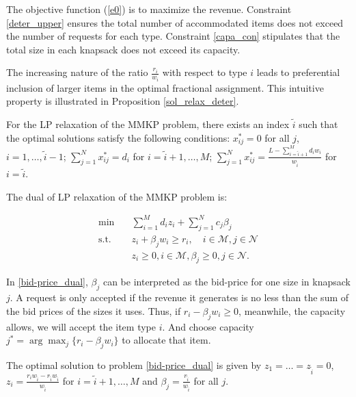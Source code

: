 The objective function (\ref{e0}) is to maximize the revenue. Constraint \eqref{deter_upper} ensures the total number of accommodated items does not exceed the number of requests for each type. Constraint \eqref{capa_con} stipulates that the total size in each knapsack does not exceed its capacity.


The increasing nature of the ratio $\frac{r_i}{w_i}$ with respect to type $i$ leads to preferential inclusion of larger items in the optimal fractional assignment. This intuitive property is illustrated in Proposition \ref{sol_relax_deter}. 


\begin{prop}\label{sol_relax_deter}
For the LP relaxation of the \textup{MMKP} problem, there exists an index $\tilde{i}$ such that the optimal solutions satisfy the following conditions: $x_{ij}^{*} = 0$ for all $j$, $i = 1,\ldots, \tilde{i}-1$; $\sum_{j=1}^{N} x_{ij}^{*} = d_{i}$ for $i = \tilde{i}+1,\ldots, M$; $\sum_{j=1}^{N} x_{ij}^{*} = \frac{L - \sum_{i = \tilde{i}+1}^{M} {d_i w_i}}{w_{\tilde{i}}}$ for $i = \tilde{i}$.
\end{prop}

The dual of LP relaxation of the MMKP problem is:

\begin{equation}\label{bid-price_dual}
    \begin{aligned}
    \min \quad & \sum_{i=1}^{M} d_i z_i + \sum_{j= 1}^{N} c_j \beta_{j} \\
    \text {s.t.} \quad & z_{i} + \beta_j w_i \geq r_i, \quad i \in \mathcal{M}, j \in \mathcal{N} \\
    & z_{i} \geq 0, i \in \mathcal{M}, \beta_{j} \geq 0, j \in \mathcal{N}.
    \end{aligned}
  \end{equation}

In \eqref{bid-price_dual}, $\beta_{j}$ can be interpreted as the bid-price for one size in knapsack $j$. A request is only accepted if the revenue it generates is no less than the sum of the bid prices of the sizes it uses. Thus, if $r_i -\beta_{j} w_i \geq 0$, meanwhile, the capacity allows, we will accept the item type $i$. And choose capacity $j^{*} = \arg \max_{j} \{r_i -\beta_{j} w_i\}$ to allocate that item.

\begin{lem}\label{bid-price}
The optimal solution to problem \eqref{bid-price_dual} is given by $z_1 = \ldots = z_{\tilde{i}} =0$, $z_{i} = \frac{r_{i} w_{\tilde{i}} - r_{\tilde{i}} w_{\tilde{i}}}{w_{\tilde{i}}}$ for $i = \tilde{i}+1, \ldots, M$ and $\beta_j = \frac{r_{\tilde{i}}}{w_{\tilde{i}}}$ for all $j$.
\end{lem}


